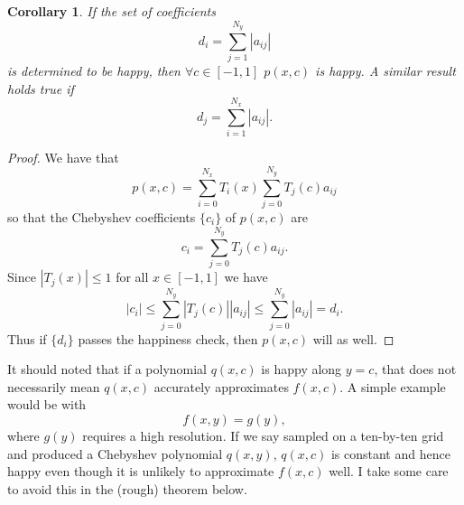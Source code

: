 \documentclass{article}
\newtheorem{corollary}{Corollary}[theorem]
\begin{document}
\begin{corollary}
\label{col2}
If the set of coefficients
$$
d_i = \sum_{j=1}^{N_y} |a_{ij}|
$$
is determined to be happy, then $\forall c \in [-1,1]$ $p(x,c)$ is happy. A similar result holds true if
$$
d_j = \sum_{i=1}^{N_x} |a_{ij}|.
$$	
\end{corollary}
\begin{proof}
We have that
\begin{equation}
p(x,c) = \sum_{i=0}^{N_x} T_{i}(x) \sum_{j=0}^{N_y} T_{j}(c) a_{ij}
\end{equation}
so that the Chebyshev coefficients $\{c_i\}$ of $p(x,c)$ are
\begin{equation}
	c_i = \sum_{j=0}^{N_y} T_j(c) a_{ij}.
\end{equation}
Since $|T_j(x)|\leq 1$ for all $x \in [-1,1]$ we have
\begin{equation}
|c_i| \leq 	\sum_{j=0}^{N_y} |T_j(c)| |a_{ij}| \leq \sum_{j=0}^{N_y}  |a_{ij}| = d_i.
\end{equation}
Thus if $\{d_i\}$ passes the happiness check, then $p(x,c)$ will as well.
\end{proof}

It should noted that if a polynomial $q(x,c)$ is happy along $y=c$, that does not necessarily mean $q(x,c)$ accurately approximates $f(x,c)$. A simple example would be with
\begin{equation}
f(x,y) = g(y),	
\end{equation}
where $g(y)$ requires a high resolution. If we say sampled on a ten-by-ten grid and produced a Chebyshev polynomial $q(x,y)$, $q(x,c)$ is constant and hence happy even though it is unlikely to approximate $f(x,c)$ well. I take some care to avoid this in the (rough) theorem below.
\end{document}
